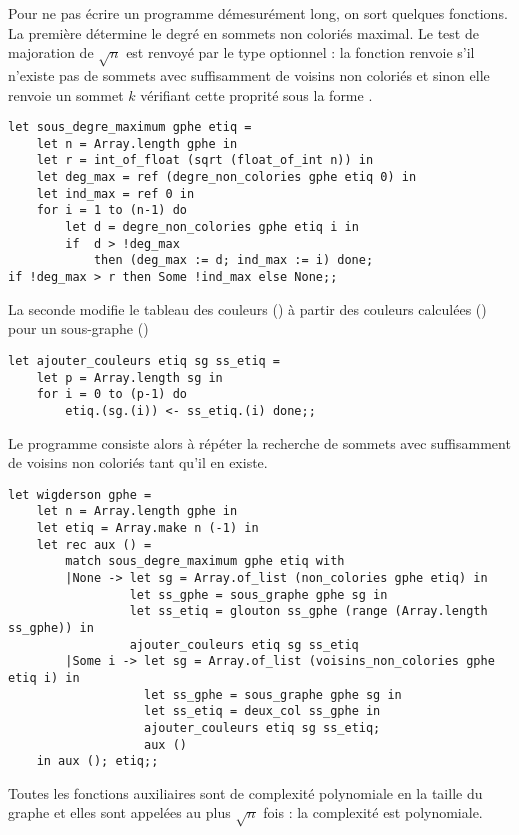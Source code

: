 \begin{Answer}Pour ne pas écrire un programme démesurément long, on sort quelques fonctions. La première détermine le degré en sommets non coloriés maximal. Le test de majoration de $\sqrt n$ est renvoyé par le type optionnel : la fonction renvoie  s'il n'existe pas de sommets avec suffisamment de voisins non coloriés et sinon elle renvoie un sommet $k$ vérifiant cette proprité sous la forme .
\begin{lstlisting}
let sous_degre_maximum gphe etiq =
    let n = Array.length gphe in
    let r = int_of_float (sqrt (float_of_int n)) in
    let deg_max = ref (degre_non_colories gphe etiq 0) in 
    let ind_max = ref 0 in
    for i = 1 to (n-1) do
        let d = degre_non_colories gphe etiq i in
        if  d > !deg_max
            then (deg_max := d; ind_max := i) done;
if !deg_max > r then Some !ind_max else None;;
\end{lstlisting}

La seconde modifie le tableau des couleurs () à partir des couleurs calculées  () pour un sous-graphe  () 
\begin{lstlisting}
let ajouter_couleurs etiq sg ss_etiq =
    let p = Array.length sg in
    for i = 0 to (p-1) do
        etiq.(sg.(i)) <- ss_etiq.(i) done;;
\end{lstlisting}

Le programme consiste alors à répéter la recherche de sommets avec suffisamment de voisins non coloriés tant qu'il en existe.
\begin{lstlisting}
let wigderson gphe =
    let n = Array.length gphe in
    let etiq = Array.make n (-1) in
    let rec aux () =
        match sous_degre_maximum gphe etiq with
        |None -> let sg = Array.of_list (non_colories gphe etiq) in
                 let ss_gphe = sous_graphe gphe sg in
                 let ss_etiq = glouton ss_gphe (range (Array.length ss_gphe)) in
                 ajouter_couleurs etiq sg ss_etiq
        |Some i -> let sg = Array.of_list (voisins_non_colories gphe etiq i) in
                   let ss_gphe = sous_graphe gphe sg in
                   let ss_etiq = deux_col ss_gphe in
                   ajouter_couleurs etiq sg ss_etiq;
                   aux ()
    in aux (); etiq;;
\end{lstlisting}

Toutes les fonctions auxiliaires sont de complexité polynomiale en la taille du graphe et elles sont appelées au plus $\sqrt n$ fois : la complexité est polynomiale.
\newpage
\end{Answer}
